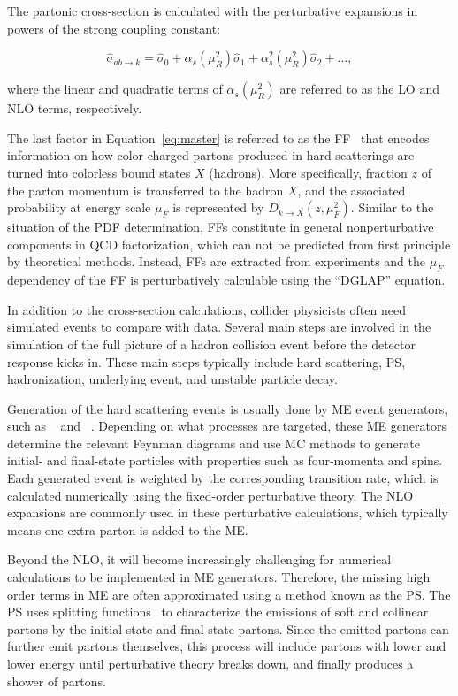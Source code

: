 The partonic cross-section is calculated with the perturbative expansions in powers of the strong coupling constant:

\begin{equation}
\label{eq:expand}
\hat{\sigma}_{ab\rightarrow k}=\hat{\sigma}_{0}+\alpha_{s}(\mu_{R}^2)\hat{\sigma}_{1}+\alpha_{s}^{2}(\mu_{R}^2)\hat{\sigma}_{2}+...,
\end{equation}

where the linear and quadratic terms of $\alpha_{s}(\mu_{R}^2)$ are referred to as the \ac{LO} and \ac{NLO} terms, respectively. 

The last factor in Equation~\ref{eq:master} is referred to as the \ac{FF}~\cite{Field:1976ve} that encodes information on how color-charged partons produced in hard scatterings are turned into colorless bound states $X$ (hadrons). More specifically, fraction $z$ of the parton momentum is transferred to the hadron $X$, and the associated probability at energy scale $\mu_{F}$ is represented by $D_{k\rightarrow X}(z,\mu_{F}^2)$. Similar to the situation of the \ac{PDF} determination, \acp{FF} constitute in general nonperturbative components in \ac{QCD} factorization, which can not be predicted from first principle by theoretical methods. Instead, \acp{FF} are extracted from experiments and the $\mu_F$ dependency of the \ac{FF} is perturbatively calculable using the ``DGLAP'' equation.

In addition to the cross-section calculations, collider physicists often need simulated events to compare with data. Several main steps are involved in the simulation of the full picture of a hadron collision event before the detector response kicks in. These main steps typically include hard scattering, \ac{PS}, hadronization, underlying event, and unstable particle decay.

Generation of the hard scattering events is usually done by \ac{ME} event generators, such as \MG~\cite{Alwall:2014hca} and \Pow~\cite{Frixione:2007vw}. Depending on what processes are targeted, these \ac{ME} generators determine the relevant Feynman diagrams and use \ac{MC} methods to generate initial- and final-state particles with properties such as four-momenta and spins. Each generated event is weighted by the corresponding transition rate, which is calculated numerically using the fixed-order perturbative theory. The \ac{NLO} expansions are commonly used in these perturbative calculations, which typically means one extra parton is added to the \ac{ME}.

Beyond the \ac{NLO}, it will become increasingly challenging for numerical calculations to be implemented in \ac{ME} generators. Therefore, the missing high order terms in \ac{ME} are often approximated using a method known as the \ac{PS}. The \ac{PS} uses splitting functions~\cite{Buckley:2011ms} to characterize the emissions of soft and collinear partons by the initial-state and final-state partons. Since the emitted partons can further emit partons themselves, this process will include partons with lower and lower energy until perturbative theory breaks down, and finally produces a shower of partons. 

